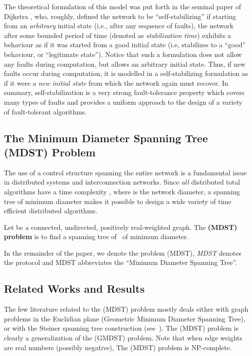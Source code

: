 \documentclass[10pt]{article}
\begin{document}
The theoretical formulation of this model was put forth in the seminal
paper of Dijkstra \cite{Dijk74}, who, roughly, defined the network to
be ``self-stabilizing'' if starting from an {\em arbitrary} initial
state (i.e., after any sequence of faults), the network after some
bounded period of time (denoted as {\em stabilization time}) exhibits
a behaviour as if it was started from a good initial state (i.e,
stabilizes to a ``good'' behaviour, or ``legitimate state''). Notice
that such a formulation does not allow any faults during computation,
but allows an arbitrary initial state. Thus, if new faults occur
during computation, it is modelled in a self-stabilizing formulation
as if it were a {\em new initial state} from which the network again
must recover.
In summary, self-stabilization is a very strong fault-tolerance
property which covers many types of faults and provides a uniform approach
to the design of a variety of fault-tolerant algorithms.

\subsection{The Minimum Diameter Spanning Tree (MDST) Problem}\label{mdstprob}
The use of a control structure spanning the entire network is a
fundamental issue in distributed systems and interconnection networks.
Since {\em all} distributed total algorithms have a time complexity
, where  is the network diameter, a spanning tree of
minimum diameter makes it possible to design a wide variety of time
efficient distributed algorithms.

Let  be a connected, undirected, positively real-weighted
graph. The {\bf (MDST) problem} is to find a spanning tree of~ of
minimum diameter.

In the remainder of the paper, we denote the problem (MDST), {\em
MDST} denotes the protocol and MDST abbreviates the ``Minimum Diameter
Spanning Tree''.

\subsection{Related Works and Results}
The few literature related to the (MDST) problem mostly deals
either with graph problems in the Euclidian plane (Geometric Minimum
Diameter Spanning Tree), or with the Steiner spanning tree
construction (see~\cite{HLCW91,IhRW91}). The (MDST) problem is clearly
a generalization of the (GMDST) problem. Note that when edge weights are
real numbers (possibly negative), The (MDST) problem is NP-complete.
\end{document}
